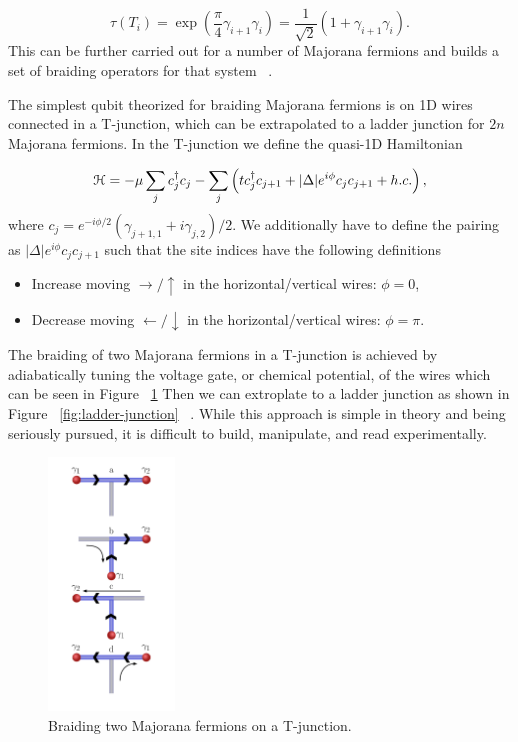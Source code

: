 \begin{equation}
  \tau(T_i) = \exp\left(\dfrac{\pi}{4} \gamma_{i+1} \gamma_i\right) = \dfrac{1}{\sqrt{2}} \left(1+ \gamma_{i+1} \gamma_i\right).
\end{equation}
This can be further carried out for a number of Majorana fermions and builds a set of braiding operators for that system ~\cite{ivanovNonAbelianStatisticsHalfQuantum2001}.

The simplest qubit theorized for braiding Majorana fermions is on 1D wires connected in a T-junction, which can be extrapolated to a ladder junction for $2n$ Majorana fermions.
In the T-junction we define the quasi-1D Hamiltonian

\begin{equation}
  \mathcal{H} = -\mu \sum_j c^{\dagger}_j c_j - \sum_j \left(tc^{\dagger}_j c_{j+1} + |\Delta|e^{i\phi} c_j c_{j+1} + h.c. \right),
\end{equation}
where
$c_j = e^{-i\phi/2} (\gamma_{j+1,1} + i \gamma_{j,2})/2$.
We additionally have to define the pairing as
$|\Delta|e^{i\phi} c_j c_{j+1}$
such that the site indices have the following definitions
\begin{itemize}
  \item Increase moving $\rightarrow / \uparrow$ in the horizontal/vertical wires: $\phi = 0$,
  \item Decrease moving $\leftarrow / \downarrow$ in the horizontal/vertical wires: $\phi = \pi$.
\end{itemize}
The braiding of two Majorana fermions in a T-junction is achieved by adiabatically tuning the voltage gate, or chemical potential, of the wires which can be seen in Figure ~\ref{fig:t-junction-braid}
Then we can extroplate to a ladder junction as shown in Figure ~\ref{fig:ladder-junction} ~\cite{aliceaNonAbelianStatisticsTopological2011}.
While this approach is simple in theory and being seriously pursued, it is difficult to build, manipulate, and read experimentally.

\begin{figure}
  \includegraphics[width=0.3\textwidth]{./figures/t-junction-braid.pdf}
  \caption{Braiding two Majorana fermions on a T-junction.}
  \label{fig:t-junction-braid}
\end{figure}

